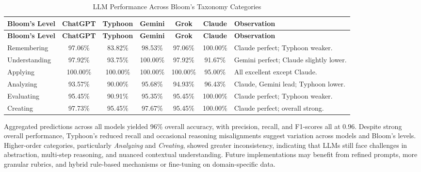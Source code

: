 {
\setlength{\LTleft}{-2.5cm}     %
\setlength{\LTright}{0pt}       %
\centering
\begin{longtable}{l c c c c c l}
    \caption{LLM Performance Across Bloom’s Taxonomy Categories}
    \label{tab:bloom_performance}
    \\

    \hline
    \textbf{Bloom’s Level} & \textbf{ChatGPT} & \textbf{Typhoon} & \textbf{Gemini} & 
    \textbf{Grok} & \textbf{Claude} & \textbf{Observation} \\ 
    \hline
    \endfirsthead

    \hline
    \textbf{Bloom’s Level} & \textbf{ChatGPT} & \textbf{Typhoon} & \textbf{Gemini} & 
    \textbf{Grok} & \textbf{Claude} & \textbf{Observation} \\ 
    \hline
    \endhead

    \hline
    \endfoot

    Remembering & 97.06\% & 83.82\% & 98.53\% & 97.06\% & 100.00\% & Claude perfect; Typhoon weaker. \\
    Understanding & 97.92\% & 93.75\% & 100.00\% & 97.92\% & 91.67\% & Gemini perfect; Claude slightly lower. \\
    Applying & 100.00\% & 100.00\% & 100.00\% & 100.00\% & 95.00\% & All excellent except Claude. \\
    Analyzing & 93.57\% & 90.00\% & 95.68\% & 94.93\% & 96.43\% & Claude, Gemini lead; Typhoon lower. \\
    Evaluating & 95.45\% & 90.91\% & 95.35\% & 95.45\% & 100.00\% & Claude perfect; Typhoon weaker. \\
    Creating & 97.73\% & 95.45\% & 97.67\% & 95.45\% & 100.00\% & Claude perfect; overall strong. \\
    
\end{longtable}
}

Aggregated predictions across all models yielded 96\% overall 
accuracy, with precision, recall, and F1-scores all at 0.96. 
Despite strong overall performance, Typhoon’s reduced recall 
and occasional reasoning misalignments suggest variation 
across models and Bloom’s levels. Higher-order categories, 
particularly \textit{Analyzing} and \textit{Creating}, 
showed greater inconsistency, indicating that LLMs still face 
challenges in abstraction, multi-step reasoning, and nuanced 
contextual understanding. Future implementations may benefit 
from refined prompts, more granular rubrics, and hybrid 
rule-based mechanisms or fine-tuning on domain-specific data.

